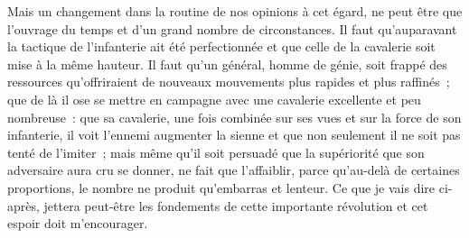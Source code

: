 \documentclass[french,twoside]{book} %
\begin{document}
Mais un changement dans la routine de nos opinions à cet égard, ne peut être que l’ouvrage du temps et d’un grand nombre de circonstances. Il faut qu’auparavant la tactique de l’infanterie ait été perfectionnée et que celle de la cavalerie soit mise à la même hauteur. Il faut qu’un général, homme de génie, soit frappé des ressources qu’offriraient de nouveaux mouvements plus rapides et plus raffinés ; que de là il ose se mettre en campagne avec une cavalerie excellente et peu nombreuse : que sa cavalerie, une fois combinée sur ses vues et sur la force de son infanterie, il voit l’ennemi augmenter la sienne et que non seulement il ne soit pas tenté de l’imiter ; mais même qu’il soit persuadé que la supériorité que son adversaire aura cru se donner, ne fait que l’affaiblir, parce qu’au-delà de certaines proportions, le nombre ne produit qu’embarras et lenteur. Ce que je vais dire ci-après, jettera peut-être les fondements de cette importante révolution et cet espoir doit m’encourager.
\end{document}
